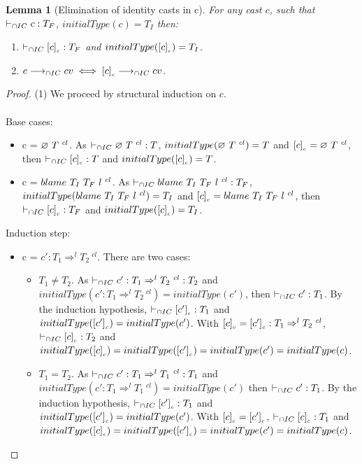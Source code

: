 \documentclass[a4paper]{article}
\newtheorem{lemma}{Lemma}
\begin{document}
\begin{lemma}[Elimination of identity casts in c]
\label{eliminationidentitycastsc}
For any cast $c$, such that $\vdash_{\cap IC} c : T_F$, $initialType(c) = T_I$ then:
\begin{enumerate}
    \item $\vdash_{\cap IC} [c]_{_c} : T_F$ and $initialType([c]_{_c}) = T_I$.
    \item $c \longrightarrow_{\cap IC} cv \iff [c]_{_c} \longrightarrow_{\cap IC} cv$.
\end{enumerate}
\end{lemma}
\begin{proof}
(1) We proceed by structural induction on $c$.\\\\
Base cases:
\begin{itemize}
    \item c = $\varnothing\ T\ ^{cl}$.
    As $\vdash_{\cap IC} \varnothing\ T\ ^{cl} : T$, $initialType(\varnothing\ T\ ^{cl}) = T$ and $[c]_{_c} = \varnothing\ T\ ^{cl}$, then $\vdash_{\cap IC} [c]_{_c} : T$ and $initialType([c]_{_c}) = T$.
    \item c = $blame\ T_I\ T_F\ l\ ^{cl}$.
    As $\vdash_{\cap IC} blame\ T_I\ T_F\ l\ ^{cl} : T_F$, $initialType(blame\ T_I\ T_F\ l\ ^{cl}) = T_I$ and $[c]_{_c} = blame\ T_I\ T_F\ l\ ^{cl}$, then $\vdash_{\cap IC} [c]_{_c} : T_F$ and $initialType([c]_{_c}) = T_I$.
\end{itemize}
Induction step:
\begin{itemize}
    \item c = $c' : T_1 \Rightarrow^l T_2\ ^{cl}$.
    There are two cases:
    \begin{itemize}
        \item $T_1 \neq T_2$.
        As $\vdash_{\cap IC} c' : T_1 \Rightarrow^l T_2\ ^{cl} : T_2$ and $initialType(c' : T_1 \Rightarrow^l T_2\ ^{cl}) = initialType(c')$, then $\vdash_{\cap IC} c' : T_1$.
        By the induction hypothesis, $\vdash_{\cap IC} [c']_{_c} : T_1$ and $initialType([c']_{_c}) = initialType(c')$.
        With $[c]_{_c} = [c']_{_c} : T_1 \Rightarrow^l T_2\ ^{cl}$, $\vdash_{\cap IC} [c]_{_c} : T_2$ and $initialType([c]_{_c}) = initialType([c']_{_c}) = initialType(c') = initialType(c)$.
        \item $T_1 = T_2$.
        As $\vdash_{\cap IC} c' : T_1 \Rightarrow^l T_1\ ^{cl} : T_1$ and $initialType(c' : T_1 \Rightarrow^l T_1\ ^{cl}) = initialType(c')$ then $\vdash_{\cap IC} c' : T_1$.
        By the induction hypothesis, $\vdash_{\cap IC} [c']_{_c} : T_1$ and $initialType([c']_{_c}) = initialType(c')$.
        With $[c]_{_c} = [c']_{_c}$, $\vdash_{\cap IC} [c]_{_c} : T_1$ and $initialType([c]_{_c}) = initialType([c']_{_c}) = initialType(c') = initialType(c)$.

\end{itemize}
\end{itemize}
\end{proof}
\end{document}
